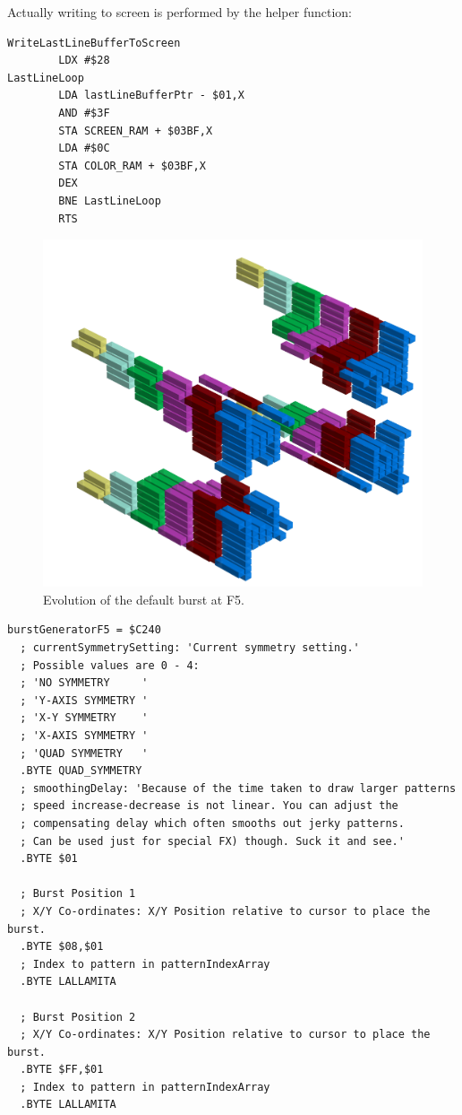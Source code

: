 \bigskip

Actually writing to screen is performed by the helper function:
\begin{lstlisting}
WriteLastLineBufferToScreen    
        LDX #$28
LastLineLoop   
        LDA lastLineBufferPtr - $01,X
        AND #$3F
        STA SCREEN_RAM + $03BF,X
        LDA #$0C
        STA COLOR_RAM + $03BF,X
        DEX 
        BNE LastLineLoop
        RTS 
\end{lstlisting}
\clearpage

\clearpage
\begin{figure}[H]
    \centering
    \begin{adjustbox}{width=12cm,center}
      \includegraphics[width=12cm]{src/patterns/bursts/pattern2-45.png}%
    \end{adjustbox}
\caption{Evolution of the default burst at F5.}
\end{figure}
\clearpage

\begin{lstlisting}[caption=Source code for the F5 Burst.]
burstGeneratorF5 = $C240
  ; currentSymmetrySetting: 'Current symmetry setting.'
  ; Possible values are 0 - 4:
  ; 'NO SYMMETRY     '
  ; 'Y-AXIS SYMMETRY '
  ; 'X-Y SYMMETRY    '
  ; 'X-AXIS SYMMETRY '
  ; 'QUAD SYMMETRY   '
  .BYTE QUAD_SYMMETRY
  ; smoothingDelay: 'Because of the time taken to draw larger patterns
  ; speed increase-decrease is not linear. You can adjust the 
  ; compensating delay which often smooths out jerky patterns. 
  ; Can be used just for special FX) though. Suck it and see.'
  .BYTE $01

  ; Burst Position 1  
  ; X/Y Co-ordinates: X/Y Position relative to cursor to place the burst.
  .BYTE $08,$01
  ; Index to pattern in patternIndexArray
  .BYTE LALLAMITA

  ; Burst Position 2
  ; X/Y Co-ordinates: X/Y Position relative to cursor to place the burst.
  .BYTE $FF,$01
  ; Index to pattern in patternIndexArray
  .BYTE LALLAMITA

\end{lstlisting}

